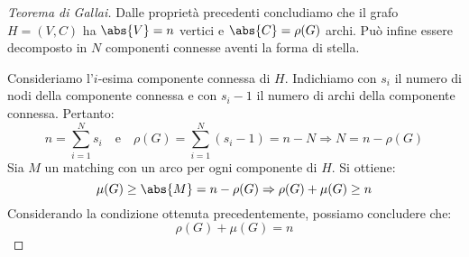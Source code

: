 \documentclass[\main/main.tex]{subfiles}
\begin{document}
\begin{proof}[Teorema di Gallai]
  Dalle proprietà precedenti concludiamo che il grafo \(H = (V, C)\) ha \(\abs{V} = n\) vertici e \(\abs{C} = \rho(G)\) archi. Può infine essere decomposto in \(N\) componenti connesse aventi la forma di stella.

  Consideriamo l'\(i\)-esima componente connessa di \(H\). Indichiamo con \(s_i\) il numero di nodi della componente connessa e con \(s_i-1\) il numero di archi della componente connessa. Pertanto:
  \[
    n = \sum_{i=1}^N s_i \quad \text{e} \quad \rho(G) = \sum_{i=1}^N (s_i -1) = n - N \Rightarrow N = n - \rho(G)
  \]
  Sia \(M\) un matching con un arco per ogni componente di \(H\). Si ottiene:
  \[
    \mu(G) \geq \abs{M} = n - \rho(G) \Rightarrow \rho(G) + \mu(G) \geq n
  \]
  Considerando la condizione ottenuta precedentemente, possiamo concludere che:
  \[
    \rho(G) + \mu(G) = n
  \]

\end{proof}
\end{document}
